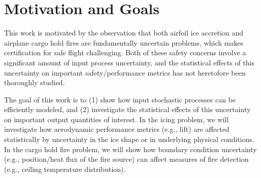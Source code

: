 \section{Motivation and Goals}
\label{sec:introduction:motivation}

This work is motivated by the observation that both airfoil ice
accretion and airplane cargo hold fires are fundamentally uncertain
problems, which makes certification for safe flight challenging. Both
of these safety concerns involve a significant amount of input process
uncertainty, and the statistical effects of this uncertainty on
important safety/performance metrics has not heretofore been
thoroughly studied.

The goal of this work is to (1) show how input stochastic processes
can be efficiently modeled, and (2) investigate the statistical
effects of this uncertainty on important output quantities of
interest. In the icing problem, we will investigate how aerodynamic
performance metrics (e.g., lift) are affected statistically by
uncertainty in the ice shape or in underlying physical conditions. In
the cargo hold fire problem, we will show how boundary condition
uncertainty (e.g., position/heat flux of the fire source) can affect
measures of fire detection (e.g., ceiling temperature distribution).


